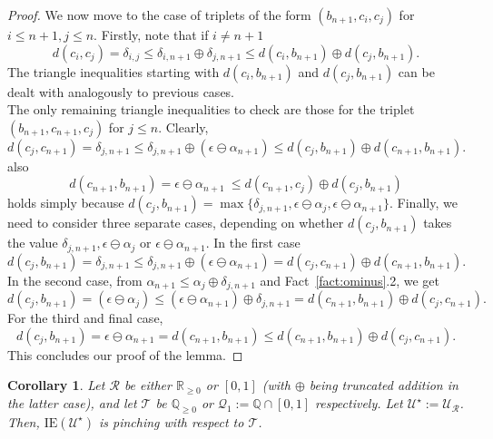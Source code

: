 \documentclass{article}
\newtheorem{corollary}[theorem]{Corollary}
\theoremstyle{remark}
\theoremstyle{definition}
\newcommand{\U}[0]{\mathbb{U}}
\renewcommand{\U}[0]{\mathcal{U}}
\renewcommand\leq{\leqslant}
\renewcommand\geq{\geqslant}
\newcommand{\rr}[0]{\mathcal{R}}
\newcommand{\ie}[0]{\mathrm{IE}}
\begin{document}
{{{{{\begin{proof}
We now move to the case of triplets of the form $(b_{n+1}, c_i, c_j)$ for $i\leq n+1, j\leq n$. Firstly, note that if $i\neq n+1$
\[d(c_i, c_j)=\delta_{i,j}\leq\delta_{i, n+1}\oplus \delta_{j, n+1}\leq d(c_i, b_{n+1})\oplus d(c_j, b_{n+1}).\]
The triangle inequalities starting with $d(c_i, b_{n+1})$ and $d(c_j, b_{n+1})$ can be dealt with analogously to previous cases.\\

The only remaining triangle inequalities to check are those for the triplet $(b_{n+1}, c_{n+1}, c_j)$ for $j\leq n$. Clearly,
\[d(c_j, c_{n+1})=\delta_{j,n+1}\leq\delta_{j, n+1}\oplus (\epsilon\ominus\alpha_{n+1})\leq d(c_j, b_{n+1})\oplus d(c_{n+1}, b_{n+1}).\] also
\[d(c_{n+1},b_{n+1})=\epsilon\ominus\alpha_{n+1}\ \leq d(c_{n+1},c_j)\oplus d(c_j,b_{n+1})\] holds simply because $d(c_j,b_{n+1})=\max\{\delta_{j,n+1},\epsilon\ominus\alpha_j,\epsilon\ominus\alpha_{n+1}\}$. Finally, we need to consider three separate cases, depending on whether  $d(c_j, b_{n+1})$ takes the value  $\delta_{j, n+1}, \epsilon\ominus\alpha_j$ or $\epsilon\ominus\alpha_{n+1}$. 
In the first case 
\[d(c_j, b_{n+1})=\delta_{j,n+1}\leq\delta_{j, n+1}\oplus (\epsilon\ominus\alpha_{n+1})= d(c_j, c_{n+1})\oplus d(c_{n+1}, b_{n+1}).\]
In the second case, from $\alpha_{n+1}\leq \alpha_j\oplus \delta_{j,n+1}$ and Fact~\ref{fact:ominus}.2, we get
\[d(c_j, b_{n+1})=(\epsilon\ominus\alpha_j)\leq (\epsilon\ominus\alpha_{n+1})\oplus \delta_{j,n+1}= d(c_{n+1}, b_{n+1})\oplus d(c_j, c_{n+1}).\]
For the third and final case,
\[d(c_j, b_{n+1})=\epsilon\ominus\alpha_{n+1}= d(c_{n+1},b_{n+1})\leq d(c_{n+1}, b_{n+1})\oplus d(c_j, c_{n+1}). \]
This concludes our proof of the lemma.
\end{proof}








\begin{corollary}\label{realcor1} Let $\rr$ be either {$\mathbb{R}_{\geq 0}$} or $[0,1]$ (with $\oplus$ being truncated addition in the latter case), and let $\mathcal{T}$ be {$\mathbb{Q}_{\geq0}$} or $\mathcal{Q}_1:=\mathbb{Q}\cap[0,1]$ respectively. Let $\U^\star:=\U_{\rr}$. Then, {$\ie(\U^\star)$} is pinching with respect to $\mathcal{T}$.
    

\end{corollary}}}}}}
\end{document}
